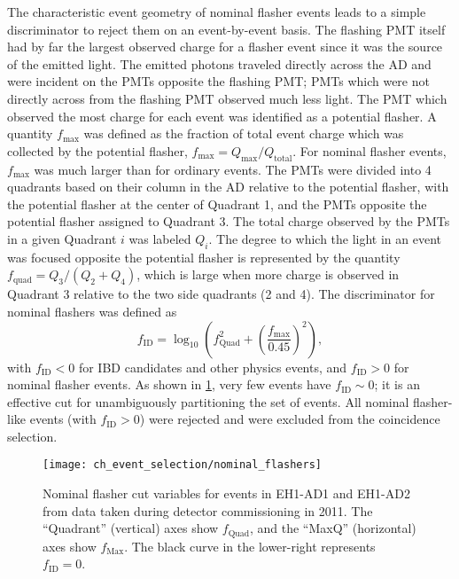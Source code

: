 The characteristic event geometry of nominal flasher events
leads to a simple discriminator to reject them on an event-by-event basis.
The flashing PMT itself had by far the largest observed charge
for a flasher event since it was the source of the emitted light.
The emitted photons traveled directly across the AD
and were incident on the PMTs opposite the flashing PMT;
PMTs which were not directly across from the flashing PMT
observed much less light.
The PMT which observed the most charge for each event
was identified as a potential flasher.
A quantity $f_{\text{max}}$ was defined as the fraction of total event charge
which was collected by the potential flasher,
$f_{\text{max}} = Q_{\text{max}}/Q_{\text{total}}$.
For nominal flasher events, $f_{\text{max}}$ was much larger than for ordinary events.
The PMTs were divided into 4 quadrants based on their column in the AD
relative to the potential flasher,
with the potential flasher at the center of Quadrant 1,
and the PMTs opposite the potential flasher assigned to Quadrant 3.
The total charge observed by the PMTs in a given Quadrant $i$
was labeled $Q_i$.
The degree to which the light in an event was focused
opposite the potential flasher
is represented by the quantity $f_{\text{quad}} = Q_3/(Q_2 + Q_4)$,
which is large when more charge is observed in Quadrant 3
relative to the two side quadrants (2 and 4).
The discriminator for nominal flashers was defined as
\begin{equation}
    f_{\text{ID}} = \log_{10}\left(
        f_{\text{Quad}}^2 + \left(
            \frac{f_{\text{max}}}{0.45}
        \right)^2
    \right),
\end{equation}
with $f_{\text{ID}} < 0$ for IBD candidates and other physics events,
and $f_{\text{ID}} > 0$ for nominal flasher events.
As shown in \cref{fig:flasher_nominal_cut},
very few events have $f_{\text{ID}}\sim0$;
it is an effective cut for unambiguously partitioning the set of events.
All nominal flasher-like events (with $f_{\text{ID}} > 0$) were rejected
and were excluded from the coincidence selection.

\begin{figure}
    \centering
    \texttt{[image: ch\_event\_selection/nominal\_flashers]}
    \caption[Nominal flasher cut variables]{
        Nominal flasher cut variables for events in EH1-AD1 and EH1-AD2
        from data taken during detector commissioning in 2011.
        The ``Quadrant'' (vertical) axes show $f_\text{Quad}$,
        and the ``MaxQ'' (horizontal) axes show $f_\text{Max}$.
        The black curve in the lower-right represents $f_\text{ID} = 0$.
    }
    \label{fig:flasher_nominal_cut}
\end{figure}

